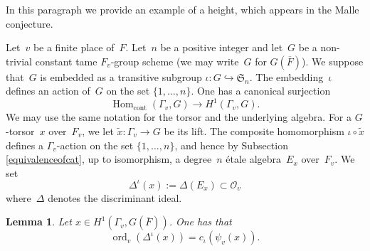 \documentclass[a4paper,english,12pt]{amsart}
\newcommand{\oF}{\overline F}
\newcommand{\doots}{,\dots ,}
\newcommand{\Fv}{F_v}
\newcommand{\Ov}{\mathcal O _v}
\DeclareMathOperator{\ord}{ord}
\DeclareMathOperator{\Hom}{Hom}
\DeclareMathOperator{\cont}{cont}
\DeclareMathOperator{\tame}{{tame}}
\newtheorem{lem}[equation]{Lemma}
\numberwithin{equation}{subsection}
\begin{document}
\subsubsection{} In this paragraph we provide an example of a height, which appears in the Malle conjecture.
%

Let~$v$ be a finite place of~$F$. Let~$n$ be a positive integer and let~$G$ be a  non-trivial constant tame $\Fv$-group scheme (we may write~$G$ for $G(\oF)$). We suppose that~$G$ is embedded as a transitive subgroup $\iota:G\hookrightarrow \mathfrak S_n$. The embedding~$\iota$ defines an action of~$G$ on the set $\{1\doots n\}$. One has a canonical surjection $$\Hom_{\cont}(\Gamma_v, G)\to H^1(\Gamma_v, G)%
.$$We may use the same notation for the torsor and the underlying algebra. For a $G$-torsor~$x$ over~$F_v$, we let $\widetilde x:\Gamma_v\to G$ be its lift. The composite homomorphism $\iota\circ {\widetilde x}$ defines a $\Gamma_v$-action on the set $\{1\doots n\}$, and hence by Subsection \ref{equivalenceofcat}, up to isomorphism, a degree~$n$ \' etale algebra~$E_x$ over~$F_v$. We set $$\Delta^{\iota}(x):=\Delta(E_x)\subset\Ov$$where~$\Delta$ denotes the discriminant ideal.
\begin{lem}
Let $x\in H^1(\Gamma_v, G(\oF))$. One has that $$\ord_v(\Delta^{\iota}(x))=c_{{\iota}}(\psi_v(x)).$$
\end{lem}
\end{document}
